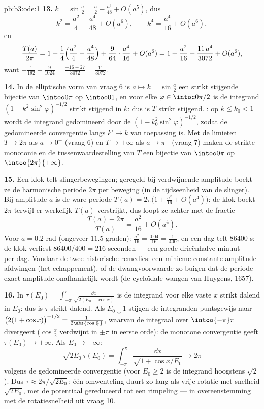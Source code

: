 \begin{solution}{pb:b3:ode:1}
\textbf{13.} $k = \sin\frac a2 = \frac a2 - \frac{a^3}{48} +
O(a^5)$, dus
\[
k^2 = \frac{a^2}4 - \frac{a^4}{48} + O(a^6),
\qquad
k^4 = \frac{a^4}{16} + O(a^6) ,
\]
en
\[
\frac{T(a)}{2\pi} = 1 + \frac14\Bigl(\frac{a^2}4 -
\frac{a^4}{48}\Bigr) + \frac9{64}\cdot\frac{a^4}{16} +
O(a^6)
= 1 + \frac{a^2}{16} + \frac{11\,a^4}{3072} + O(a^6) ,
\]
want $-\frac1{192} + \frac9{1024} = \frac{-16 + 27}{3072} =
\frac{11}{3072}$.

\textbf{14.} In de elliptische vorm van vraag 6 is $a \mapsto k =
\sin\frac a2$ een  strikt stijgende bijectie van
$\intoo0\pi$ op $\intoo01$, en voor elke $\varphi \in
\intoc0{\pi/2}$ is de integrand $(1 - k^2\sin^2\varphi)^{-1/2}$
strikt stijgend in $k$: dus is $T$ strikt stijgend.
: op $k \leq k_0 < 1$ wordt de integrand gedomineerd
door de  $(1 - k_0^2\sin^2\varphi)^{-1/2}$, zodat de
gedomineerde convergentie langs $k' \to k$ van toepassing is. Met
de limieten $T \to 2\pi$ als $a \to 0^+$ (vraag 6) en $T \to
+\infty$ als $a \to \pi^-$ (vraag 7) maken de strikte monotonie
en de tussenwaardestelling van $T$ een bijectie van $\intoo0\pi$
op $\intoo{2\pi}{+\infty}$.

\textbf{15.} Een klok telt slingerbewegingen; geregeld bij
verdwijnende amplitude boekt ze de harmonische periode $2\pi$ per
beweging (in de tijdseenheid van de slinger). Bij amplitude $a$
is de ware periode $T(a) = 2\pi\bigl(1 + \frac{a^2}{16} +
O(a^4)\bigr)$: de klok boekt $2\pi$ terwijl er werkelijk $T(a)$
verstrijkt, dus loopt ze achter met de fractie
\[
\frac{T(a) - 2\pi}{T(a)} = \frac{a^2}{16} + O(a^4) .
\]
Voor $a = 0.2$ rad (ongeveer $11.5$ graden): $\frac{a^2}{16} =
\frac{0.04}{16} = \frac1{400}$, en een dag telt $86400$ s: de
klok verliest $86400/400 = 216$ seconden --- een goede drieënhalve
minuut --- per dag. Vandaar de twee historische remedies: een
minieme constante amplitude afdwingen (het echappement), of de
dwangvoorwaarde zo buigen dat de periode exact
amplitude-onafhankelijk wordt (de cycloïdale wangen van Huygens,
1657).

\textbf{16.} In $\tau(E_0) = \int_{-\pi}^{\pi}\frac{\dd
x}{\sqrt{2(E_0 + \cos x)}}$ is de integrand voor elke vaste $x$
strikt dalend in $E_0$: dus is $\tau$ strikt dalend. Als $E_0
\downarrow 1$ stijgen de integranden puntsgewijs naar $\bigl(2(1
+ \cos x)\bigr)^{-1/2} = \frac1{2\abs{\cos\frac x2}}$, waarvan de
integraal over $\intoo{-\pi}\pi$ divergeert ($\cos\frac x2$
verdwijnt in $\pm\pi$ in eerste orde): de monotone convergentie
geeft $\tau(E_0) \to +\infty$. Als $E_0 \to +\infty$:
\[
\sqrt{2E_0}\,\tau(E_0) = \int_{-\pi}^{\pi}
\frac{\dd x}{\sqrt{1 + \cos x/E_0}} \longrightarrow 2\pi
\]
volgens de gedomineerde convergentie (voor $E_0 \geq 2$ is de
integrand hoogstens $\sqrt2$). Dus $\tau \approx
2\pi/\sqrt{2E_0}$: één omwenteling duurt zo lang als vrije
rotatie met snelheid $\sqrt{2E_0}$, met de potentiaal gereduceerd
tot een rimpeling --- in overeenstemming met de rotatiesnelheid
uit vraag 10.


\end{solution}
